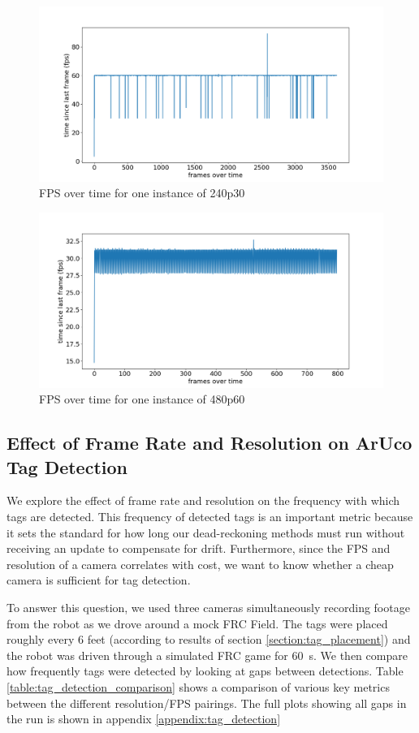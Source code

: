 \documentclass{article}
\begin{document}
    \begin{figure}[H]
      \centering
      \includegraphics[width=0.8\linewidth]{./images/fps_plot_2.png}
      \caption{FPS over time for one instance of 240p30}
      \label{fig:fps_plot_2}
    \end{figure}

    \begin{figure}[H]
      \centering
      \includegraphics[width=0.8\linewidth]{./images/fps_plot_1.png}
      \caption{FPS over time for one instance of  480p60}
      \label{fig:fps_plot_1}
    \end{figure}

	\subsection{Effect of Frame Rate and Resolution on ArUco Tag Detection}

    We explore the effect of frame rate and resolution on the frequency with which tags are detected. This frequency of detected tags is an important metric because it sets the standard for how long our dead-reckoning methods must run without receiving an update to compensate for drift. Furthermore, since the FPS and resolution of a camera correlates with cost, we want to know whether a cheap camera is sufficient for tag detection.

      To answer this question, we used three cameras simultaneously recording footage from the robot as we drove around a mock FRC Field. The tags were placed roughly every 6 feet (according to results of section \ref{section:tag_placement}) and the robot was driven through a simulated FRC game for \SI{60}{\second}. We then compare how frequently tags were detected by looking at gaps between detections. Table \ref{table:tag_detection_comparison} shows a comparison of various key metrics between the different resolution/FPS pairings. The full plots showing all gaps in the run is shown in appendix \ref{appendix:tag_detection}
\end{document}
